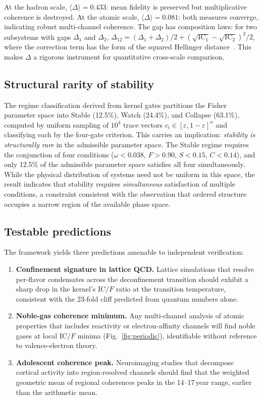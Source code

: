 \documentclass[11pt]{article}
\newcommand{\eps}{\varepsilon}
\newcommand{\IC}{\mathrm{IC}}
\begin{document}
At the hadron scale, $\langle\Delta\rangle = 0.433$: mean fidelity
is preserved but multiplicative coherence is destroyed. At the
atomic scale, $\langle\Delta\rangle = 0.081$: both measures converge,
indicating robust multi-channel coherence. The gap has composition
laws: for two subsystems with gaps $\Delta_1$ and $\Delta_2$,
$\Delta_{12} = (\Delta_1 + \Delta_2)/2
+ (\sqrt{\IC_1} - \sqrt{\IC_2})^2/2$, where the correction term has
the form of the squared Hellinger
distance~\cite{hellinger1909}. This makes $\Delta$ a rigorous
instrument for quantitative cross-scale comparison.

\subsection{Structural rarity of stability}

The regime classification derived from kernel
gates partitions the Fisher parameter space into
Stable (12.5\%), Watch (24.4\%), and Collapse (63.1\%),
computed by uniform sampling of $10^4$ trace vectors
$c_i \in [\eps, 1{-}\eps]^n$ and classifying each by the
four-gate criterion. This carries an implication: \emph{stability
is structurally rare} in the admissible parameter space. The
Stable regime requires the conjunction of four conditions
($\omega < 0.038$, $F > 0.90$, $S < 0.15$, $C < 0.14$), and only
12.5\% of the admissible parameter space satisfies all four
simultaneously. While the physical distribution of systems need not
be uniform in this space, the result indicates that stability
requires \emph{simultaneous} satisfaction of multiple conditions, a
constraint consistent with the observation that ordered structure
occupies a narrow region of the available phase space.

\subsection{Testable predictions}

The framework yields three predictions amenable to independent
verification:

\begin{enumerate}[leftmargin=2em,itemsep=2pt]
\item \textbf{Confinement signature in lattice QCD.}
  Lattice simulations that resolve per-flavor condensates
  across the deconfinement transition should exhibit a sharp
  drop in the kernel's $\IC/F$ ratio at the transition
  temperature, consistent with the 23-fold cliff predicted
  from quantum numbers alone.
\item \textbf{Noble-gas coherence minimum.}
  Any multi-channel analysis of atomic properties that includes
  reactivity or electron-affinity channels will find noble gases at
  local $\IC/F$ minima (Fig.~\ref{fig:periodic}), identifiable
  without reference to valence-electron theory.
\item \textbf{Adolescent coherence peak.}
  Neuroimaging studies that decompose cortical activity into
  region-resolved channels should find that the weighted geometric
  mean of regional coherences peaks in the 14--17\,year range,
  earlier than the arithmetic mean.
\end{enumerate}
\end{document}
